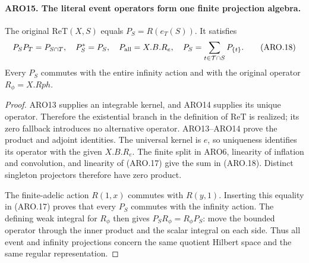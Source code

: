 \paragraph{ARO15. The literal event operators form one finite projection algebra.}
\label{claim:ARO15}
The original \(\mathrm{ReT}(X,S)\) equals \(P_S=R(e_T(S))\).
It satisfies
\[
 P_SP_T=P_{S\cap T},\quad P_S^*=P_S,\quad
 P_{\rm all}=X.B.R_e,
 \quad P_S=\sum_{t\in\mathcal T\cap S}P_{\{t\}}.
 \tag{ARO.18}
\]
Every \(P_S\) commutes with the entire infinity action and with
the original operator \(R_\phi=X.Rph\).
\begin{proof}
ARO13 supplies an integrable kernel, and ARO14 supplies its unique
operator.  Therefore the existential branch in the definition of
\(\mathrm{ReT}\) is realized; its zero fallback introduces no
alternative operator.  ARO13--ARO14 prove the product and adjoint
identities.  The universal kernel is \(e\), so uniqueness identifies
its operator with the given \(X.B.R_e\).  The finite split in ARO6,
linearity of inflation and convolution, and linearity of (ARO.17)
give the sum in (ARO.18).  Distinct singleton projectors therefore
have zero product.

The finite-adelic action \(R(1,x)\) commutes with \(R(y,1)\).
Inserting this equality in (ARO.17) proves that every \(P_S\)
commutes with the infinity action.  The defining weak integral for
\(R_\phi\) then gives \(P_SR_\phi=R_\phi P_S\): move the bounded
operator through the inner product and the scalar integral on
each side.  Thus all event and infinity projections concern the
same quotient Hilbert space and the same regular representation.
\end{proof}

